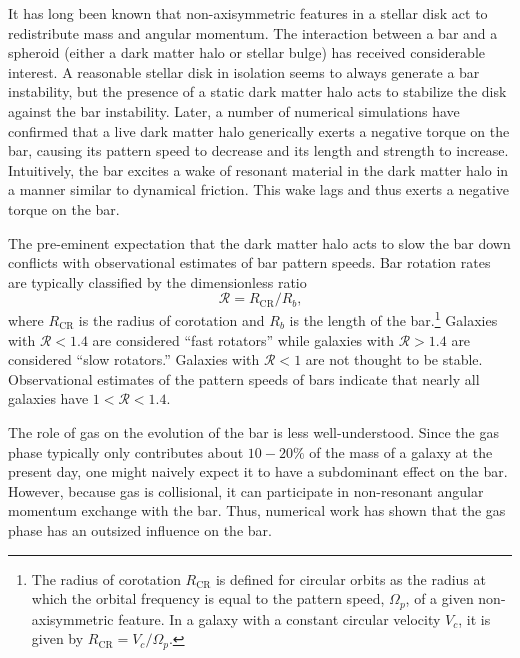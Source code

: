 \documentclass{natureprintstyle}
\newcommand{\RCR}{\ensuremath{R_{\textrm{CR}}}}
\newcommand{\Rot}{\ensuremath{\mathcal{R}}}
\begin{document}
\vspace{1cm}


It has long been known that non-axisymmetric features in a stellar disk act to
redistribute mass and angular momentum.\cite{1972MNRAS.157....1L} The
interaction between a bar and a spheroid (either a dark matter halo or stellar
bulge) has received considerable interest.\cite{1984MNRAS.209..729T,
1985MNRAS.213..451W} A reasonable stellar disk in isolation seems to always
generate a bar instability,\cite{1971ApJ...168..343H} but the presence of a
static dark matter halo acts to stabilize the disk against the bar
instability.\cite{1973ApJ...186..467O, 1976AJ.....81...30H} Later, a number of
numerical simulations have confirmed that a live dark matter halo generically
exerts a negative torque on the bar, causing its pattern speed to decrease and
its length and strength to increase\cite{1992ApJ...400...80H,
2000ApJ...543..704D, 2002MNRAS.330...35A, 2002ApJ...569L..83A,
2003MNRAS.341.1179A, 2003MNRAS.346..251O, 2005MNRAS.363..991H,
2006ApJ...637..214M, 2007MNRAS.375..460W, 2009ApJ...697..293D}. Intuitively,
the bar excites a wake of resonant material in the dark matter halo in a
manner similar to dynamical friction. This wake lags and thus exerts a
negative torque on the bar.

The pre-eminent expectation that the dark matter halo acts to slow the bar
down conflicts with observational estimates of bar pattern speeds. Bar
rotation rates are typically classified by the dimensionless ratio
\begin{equation}
\Rot = \RCR/R_b\textrm{,}
\end{equation}
where \RCR{} is the radius of corotation and $R_b$ is the length of the
bar.\footnote{The radius of corotation \RCR{} is defined for circular orbits as
the radius at which the orbital frequency is equal to the pattern speed,
$\Omega_p$, of a given non-axisymmetric feature. In a galaxy with a constant
circular velocity $V_c$, it is given by $\RCR = V_c / \Omega_p$.} Galaxies
with $\Rot < 1.4$ are considered ``fast rotators'' while galaxies with $\Rot >
1.4$ are considered ``slow rotators.''\cite{2000ApJ...543..704D} Galaxies with
$\Rot < 1$ are not thought to be stable.\cite{1980AA....81..198C}
Observational estimates of the pattern speeds of bars indicate that nearly all
galaxies have $1 < \Rot < 1.4$.\cite{2011MSAIS..18...23C, 2015AA...576A.102A,
2019MNRAS.482.1733G} 

The role of gas on the evolution of the bar is less well-understood. Since the
gas phase typically only contributes about $10-20\%$ of the mass of a galaxy
at the present day, one might naively expect it to have a subdominant effect
on the bar. However, because gas is collisional, it can participate in
non-resonant angular momentum exchange with the bar. Thus, numerical work has
shown that the gas phase has an outsized influence on the
bar.\cite{2010ApJ...719.1470V, 2013MNRAS.429.1949A}
\end{document}
